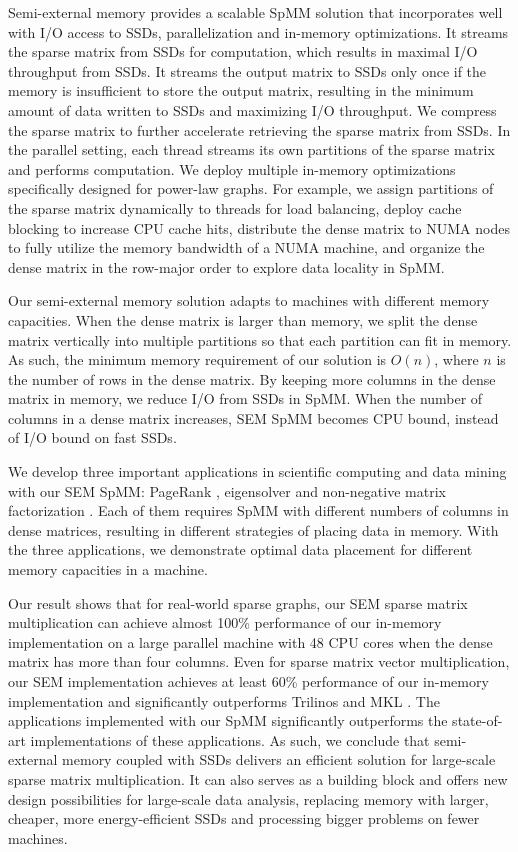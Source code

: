 Semi-external memory provides a scalable SpMM solution that incorporates well
with I/O access to SSDs, parallelization and in-memory optimizations.
It streams the sparse matrix from SSDs for computation, which results in maximal
I/O throughput from SSDs. It streams the output matrix to SSDs only once if
the memory is insufficient to store the output matrix, resulting in
the minimum amount of data written to SSDs and maximizing I/O throughput.
We compress the sparse matrix to further accelerate retrieving the sparse
matrix from SSDs. In the parallel setting, each thread streams its own partitions
of the sparse matrix and performs computation.
We deploy multiple in-memory optimizations specifically designed for power-law
graphs. For example, we assign partitions of the sparse matrix dynamically to
threads for load balancing, deploy cache blocking to increase CPU cache hits,
distribute the dense matrix to NUMA nodes to fully utilize the memory
bandwidth of a NUMA machine, and organize the dense matrix in the row-major order
to explore data locality in SpMM.

Our semi-external memory solution adapts to machines with different memory
capacities. When the dense matrix is larger than memory, we split the dense
matrix vertically into multiple partitions so that each partition can fit in
memory. As such, the minimum memory requirement of our solution is $O(n)$,
where $n$ is the number of rows in the dense matrix. By keeping more columns
in the dense matrix in memory, we reduce I/O from SSDs in SpMM. When the number
of columns in a dense matrix increases, SEM SpMM becomes CPU bound, instead of
I/O bound on fast SSDs.

We develop three important applications in scientific computing and data mining
with our SEM SpMM: PageRank \cite{pagerank}, eigensolver \cite{anasazi} and
non-negative matrix factorization \cite{nmf}. Each of them requires SpMM with
different numbers of columns in dense matrices, resulting in different
strategies of placing data in memory.
With the three applications, we demonstrate optimal data placement for
different memory capacities in a machine.


Our result shows that for real-world sparse graphs, our SEM sparse matrix
multiplication can achieve almost 100\% performance of our in-memory implementation
on a large parallel machine with 48 CPU cores
when the dense matrix has more than four columns. Even for sparse matrix vector
multiplication, our SEM implementation achieves at least 60\% performance of
our in-memory implementation and significantly outperforms Trilinos \cite{trilinos}
and MKL \cite{mkl}. The applications implemented with our SpMM significantly
outperforms the state-of-art implementations of these applications. As such,
we conclude that semi-external memory coupled with SSDs delivers an efficient
solution for large-scale sparse matrix multiplication. It can also serves
as a building block and offers new design possibilities for large-scale
data analysis, replacing memory with larger, cheaper, more energy-efficient SSDs
and processing bigger problems on fewer machines.
